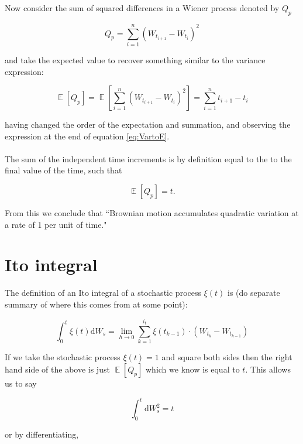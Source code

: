 \documentclass[12pt]{article}
\DeclareMathOperator*{\E}{\mathbb{E}}
\begin{document}
\noindent Now consider the sum of squared differences in a Wiener process denoted by $Q_p$

\begin{equation}
	Q_p=\sum_{i=1}^n\left(W_{t_{i+1}} - W_{t_i}\right)^2
\end{equation}

\noindent and take the expected value to recover something similar to the variance expression:

\begin{equation}
	\E[Q_p] = \E\left[\sum_{i=1}^n\left(W_{t_{i+1}} - W_{t_i}\right)^2\right] =\sum_{i=1}^n t_{i+1} - t_i
\end{equation}

\noindent having changed the order of the expectation and summation, and observing the expression at the end of equation \ref{eq:VartoE}.\\
\\
The sum of the independent time increments is by definition equal to the to the final value of the time, such that

\begin{equation}
	\E[Q_p] = t.
\end{equation}

\noindent From this we conclude that ``Brownian motion accumulates quadratic variation at a rate of 1 per unit of time."

\section{Ito integral}


The definition of an Ito integral of a stochastic process $\xi(t)$ is (do separate summary of where this comes from at some point):

\begin{equation} \label{eq:itoIntegral}
	\int_{0}^{t} \xi(t)\mathrm{d}W_s = \lim\limits_{h\to 0}\sum_{k=1}^{i_t}\xi(t_{k-1})\cdot \left(W_{t_k}-W_{t_{k-1}}\right)
\end{equation}

\noindent If we take the stochastic process $\xi(t)=1$ and square both sides then the right hand side of the above is just $\E[Q_p]$ which we know is equal to $t$. This allows us to say

\begin{equation}
	\int_{0}^{t}\mathrm{d}W_s^2 = t
\end{equation}

\noindent or by differentiating,
\end{document}
